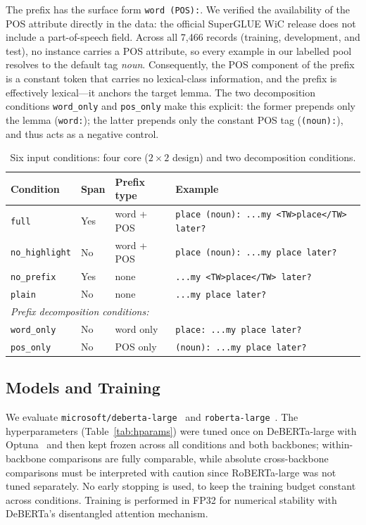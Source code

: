 \documentclass[runningheads]{llncs}
\begin{document}
The prefix has the surface form \texttt{word (POS):}. We verified the
availability of the POS attribute directly in the data: the official SuperGLUE
WiC release does not include a part-of-speech field. Across all 7{,}466 records
(training, development, and test), no instance carries a POS attribute, so every
example in our labelled pool resolves to the default tag \emph{noun}.
Consequently, the POS component of the prefix is a constant token that carries
no lexical-class information, and the prefix is effectively lexical---it anchors
the target lemma. The two decomposition conditions \texttt{word\_only} and
\texttt{pos\_only} make this explicit: the former prepends only the lemma
(\texttt{word:}); the latter prepends only the constant POS tag
(\texttt{(noun):}), and thus acts as a negative control.

\begin{table}[t]
\centering
\caption{Six input conditions: four core ($2{\times}2$ design) and two
decomposition conditions.}
\label{tab:conditions}
\begin{tabular}{llll}
\toprule
Condition & Span & Prefix type & Example\\
\midrule
\texttt{full} & Yes & word + POS & \texttt{place (noun): ...my <TW>place</TW> later?}\\
\texttt{no\_highlight} & No & word + POS & \texttt{place (noun): ...my place later?}\\
\texttt{no\_prefix} & Yes & none & \texttt{...my <TW>place</TW> later?}\\
\texttt{plain} & No & none & \texttt{...my place later?}\\
\midrule
\multicolumn{4}{l}{\emph{Prefix decomposition conditions:}}\\
\texttt{word\_only} & No & word only & \texttt{place: ...my place later?}\\
\texttt{pos\_only} & No & POS only & \texttt{(noun): ...my place later?}\\
\bottomrule
\end{tabular}
\end{table}

\subsection{Models and Training}
\label{subsec:training}

We evaluate \texttt{microsoft/deberta-large}~\cite{he2021deberta} and
\texttt{roberta-large}~\cite{liu2019roberta}. The hyperparameters
(Table~\ref{tab:hparams}) were tuned once on DeBERTa-large with
Optuna~\cite{akiba2019optuna} and then kept frozen across all conditions and
both backbones; within-backbone comparisons are fully comparable, while absolute
cross-backbone comparisons must be interpreted with caution since RoBERTa-large
was not tuned separately. No early stopping is used, to keep the training budget
constant across conditions. Training is performed in FP32 for numerical
stability with DeBERTa's disentangled attention mechanism.
\end{document}

